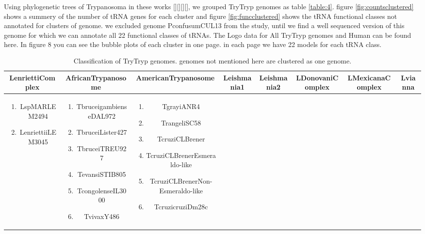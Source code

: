 \documentclass[
10pt, %
a4paper, %
oneside, %
headinclude,footinclude, %
BCOR5mm, %
]{scrartcl}
\begin{document}
Using phylogenetic trees of Trypanosoma in these works [][][][], we grouped TryTryp genomes as table \ref{table:4}. figure \ref{fig:countsclustered} shows a summery of the number of tRNA genes for each cluster and figure \ref{fig:funcclustered} shows the tRNA functional classes not annotated for clusters of genome. we excluded genome PconfusumCUL13 from the study, until we find a well sequenced version of this genome for which we can annotate all 22 functional classes of tRNAs. The Logo data for All TryTryp genomes and Human can be found here. 
In figure 8 you can see the bubble plots of each cluster in one page. in each page we have 22 models for each tRNA class. 
\begin{table}[hbt] 
\caption{Classification of TryTryp genomes. genomes not mentioned here are clustered as one genome.}
\begin{adjustbox}{width=\columnwidth,center}
\begin{tabular}{|c|c|c|c|c|c|c|c|}
        \toprule LenriettiComplex & AfricanTrypanosome & AmericanTrypanosome & Leishmania1 & Leishmania2 &LDonovaniComplex & LMexicanaComplex & Lvianna \\\midrule
        \parbox{.45\textwidth} {\begin{enumerate}
            \item LspMARLEM2494
            \item LenriettiiLEM3045
        \end{enumerate}} & \parbox{.45\textwidth}{\begin{enumerate}
            \item TbruceigambienseDAL972
            \item TbruceiLister427
            \item TbruceiTREU927
            \item TevansiSTIB805
            \item TcongolenseIL3000
            \item TvivaxY486
        \end{enumerate}} & \parbox{.45\textwidth}{\begin{enumerate}
            \item TgrayiANR4
            \item TrangeliSC58
            \item TcruziCLBrener
            \item TcruziCLBrenerEsmeraldo-like
            \item TcruziCLBrenerNon-Esmeraldo-like
            \item TcruzicruziDm28c

\end{enumerate}}
\end{tabular}
\end{adjustbox}
\end{table}
\end{document}
